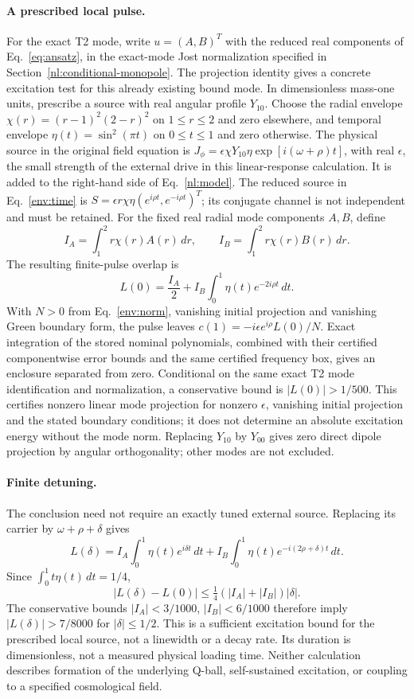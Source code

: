 \paragraph{A prescribed local pulse.}
For the exact T2 mode, write $u=(A,B)^T$ with the reduced real components
of Eq.~\eqref{eq:ansatz}, in the exact-mode Jost normalization specified in
Section~\ref{nl:conditional-monopole}. The projection identity gives a
concrete excitation test for this already existing bound mode.
In dimensionless mass-one units, prescribe a source with real angular
profile $Y_{10}$. Choose the radial envelope
$\chi(r)=(r-1)^2(2-r)^2$ on $1\le r\le2$
and zero elsewhere, and temporal envelope $\eta(t)=\sin^2(\pi t)$ on
$0\le t\le1$ and zero otherwise. The physical source in the original field equation is
$J_\phi=\epsilon\chi Y_{10}\eta\exp[i(\omega+\rho)t]$, with real
$\epsilon$, the small strength of the external drive in this linear-response
calculation. It is added to the right-hand side of Eq.~\eqref{nl:model}.
The reduced source in Eq.~\eqref{env:time} is
$S=\epsilon r\chi\eta(e^{i\rho t},e^{-i\rho t})^T$;
its conjugate channel is not independent and must be retained. For the fixed real
radial mode components $A,B$, define
\[
 I_A=\int_1^2 r\chi(r)A(r)\,dr,\qquad
 I_B=\int_1^2 r\chi(r)B(r)\,dr.
\]
The resulting finite-pulse overlap is
\[
L(0)=\frac{I_A}{2}+I_B\int_0^1\eta(t)e^{-2i\rho t}\,dt.
\]
With $N>0$ from Eq.~\eqref{env:norm}, vanishing initial projection and
vanishing Green boundary form, the pulse leaves
$c(1)=-i\epsilon e^{i\rho}L(0)/N$.
Exact integration of the stored nominal polynomials, combined with their
certified componentwise error bounds and the same certified frequency box,
gives an enclosure separated from zero. Conditional on the same exact T2
mode identification and normalization,
a conservative bound is $|L(0)|>1/500$. This certifies nonzero linear mode
projection for nonzero $\epsilon$, vanishing initial projection and the
stated boundary conditions; it does not determine an absolute excitation
energy without the mode norm. Replacing $Y_{10}$ by $Y_{00}$ gives zero
direct dipole projection by angular orthogonality; other modes are not excluded.

\paragraph{Finite detuning.}
The conclusion need not require an exactly tuned external source. Replacing
its carrier by $\omega+\rho+\delta$ gives
\[
 L(\delta)=I_A\int_0^1\eta(t)e^{i\delta t}\,dt
 +I_B\int_0^1\eta(t)e^{-i(2\rho+\delta)t}\,dt.
\]
Since $\int_0^1t\eta(t)\,dt=1/4$,
\[
 |L(\delta)-L(0)|\le\tfrac14(|I_A|+|I_B|)|\delta|.
\]
The conservative bounds $|I_A|<3/1000$, $|I_B|<6/1000$ therefore imply
$|L(\delta)|>7/8000$ for $|\delta|\le1/2$. This is a sufficient excitation
bound for the prescribed local source, not a linewidth or a decay rate.
Its duration is dimensionless, not a measured physical loading time.
Neither calculation describes formation of the underlying Q-ball,
self-sustained excitation, or coupling to a specified cosmological field.
